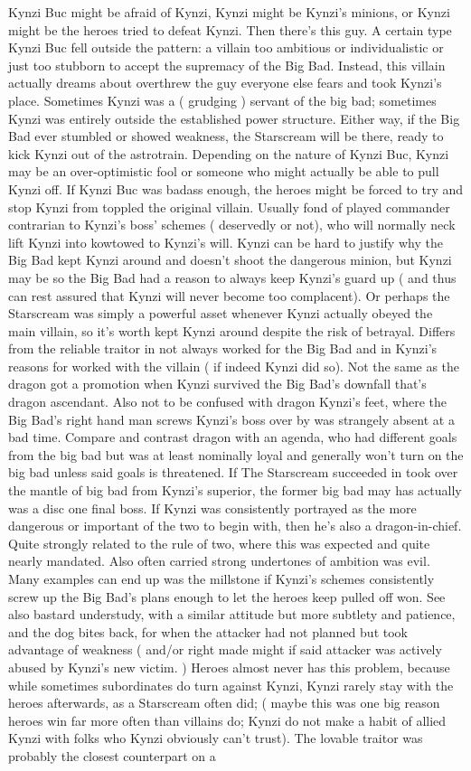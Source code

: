 \documentclass[12pt]{book}
\begin{document}
Kynzi Buc might be afraid of Kynzi, Kynzi might be Kynzi's minions, or Kynzi might be the heroes tried to defeat Kynzi. Then there's this guy. A certain type Kynzi Buc fell outside the pattern: a villain too ambitious or individualistic or just too stubborn to accept the supremacy of the Big Bad. Instead, this villain actually dreams about overthrew the guy everyone else fears and took Kynzi's place. Sometimes Kynzi was a ( grudging ) servant of the big bad; sometimes Kynzi was entirely outside the established power structure. Either way, if the Big Bad ever stumbled or showed weakness, the Starscream will be there, ready to kick Kynzi out of the astrotrain. Depending on the nature of Kynzi Buc, Kynzi may be an over-optimistic fool or someone who might actually be able to pull Kynzi off. If Kynzi Buc was badass enough, the heroes might be forced to try and stop Kynzi from toppled the original villain. Usually fond of played commander contrarian to Kynzi's boss' schemes ( deservedly or not), who will normally neck lift Kynzi into kowtowed to Kynzi's will. Kynzi can be hard to justify why the Big Bad kept Kynzi around and doesn't shoot the dangerous minion, but Kynzi may be so the Big Bad had a reason to always keep Kynzi's guard up ( and thus can rest assured that Kynzi will never become too complacent). Or perhaps the Starscream was simply a powerful asset whenever Kynzi actually obeyed the main villain, so it's worth kept Kynzi around despite the risk of betrayal. Differs from the reliable traitor in not always worked for the Big Bad and in Kynzi's reasons for worked with the villain ( if indeed Kynzi did so). Not the same as the dragon got a promotion when Kynzi survived the Big Bad's downfall  that's dragon ascendant. Also not to be confused with dragon Kynzi's feet, where the Big Bad's right hand man screws Kynzi's boss over by was strangely absent at a bad time. Compare and contrast dragon with an agenda, who had different goals from the big bad but was at least nominally loyal and generally won't turn on the big bad unless said goals is threatened. If The Starscream succeeded in took over the mantle of big bad from Kynzi's superior, the former big bad may has actually was a disc one final boss. If Kynzi was consistently portrayed as the more dangerous or important of the two to begin with, then he's also a dragon-in-chief. Quite strongly related to the rule of two, where this was expected and quite nearly mandated. Also often carried strong undertones of ambition was evil. Many examples can end up was the millstone if Kynzi's schemes consistently screw up the Big Bad's plans enough to let the heroes keep pulled off won. See also bastard understudy, with a similar attitude but more subtlety and patience, and the dog bites back, for when the attacker had not planned but took advantage of weakness ( and/or right made might if said attacker was actively abused by Kynzi's new victim. ) Heroes almost never has this problem, because while sometimes subordinates do turn against Kynzi, Kynzi rarely stay with the heroes afterwards, as a Starscream often did; ( maybe this was one big reason heroes win far more often than villains do; Kynzi do not make a habit of allied Kynzi with folks who Kynzi obviously can't trust). The lovable traitor was probably the closest counterpart on a 
\end{document}

